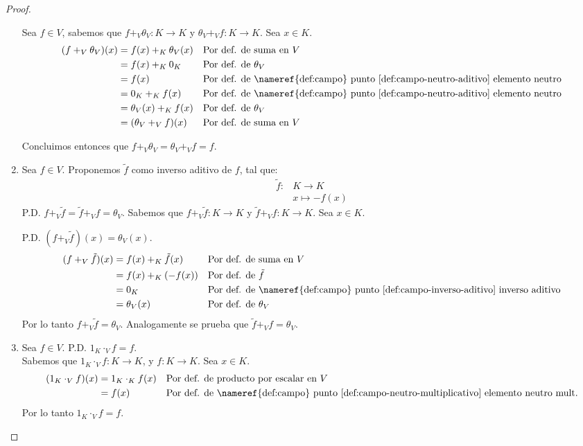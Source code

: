 \begin{proof}
\begin{enumerate}
        Sea $f \in V$, sabemos que $f +_V \theta_V: K \rightarrow K$ y $\theta_V +_V f: K \rightarrow K$. Sea $x \in K$.
        \begin{align*}
            (f +_V \theta_V)(x) &= f(x) +_K \theta_V(x) && \text{Por def. de suma en $V$} \\
            &= f(x) +_K 0_K && \text{Por def. de $\theta_V$} \\
            &= f(x) && \text{Por def. de \nameref{def:campo} punto \ref{def:campo-neutro-aditivo} elemento neutro} \\
            &= 0_K +_K f(x) && \text{Por def. de \nameref{def:campo} punto \ref{def:campo-neutro-aditivo} elemento neutro} \\
            &= \theta_V(x) +_K f(x) && \text{Por def. de $\theta_V$} \\
            &= (\theta_V +_V f)(x) && \text{Por def. de suma en $V$}
        \end{align*}
    
        Concluimos entonces que $f +_V \theta_V = \theta_V +_V f = f$.



        \item Sea $f \in V$. Proponemos $\tilde{f}$ como inverso aditivo de $f$, tal que:
        \begin{align*}
            \tilde{f}:& K \rightarrow K \\
            &x \mapsto -f(x)
        \end{align*}
        P.D. $f +_V \tilde{f} = \tilde{f} +_V f = \theta_V$.
        Sabemos que $f +_V \tilde{f}: K \rightarrow K$ y $\tilde{f} +_V f: K \rightarrow K$. Sea $x \in K$.
    
        P.D. $(f +_V \tilde{f})(x) = \theta_V(x)$.
        \begin{align*}
            (f +_V \tilde{f})(x) &= f(x) +_K \tilde{f}(x) && \text{Por def. de suma en $V$} \\
            &= f(x) +_K (-f(x)) && \text{Por def. de $\tilde{f}$} \\
            &= 0_K && \text{Por def. de \nameref{def:campo} punto \ref{def:campo-inverso-aditivo} inverso aditivo} \\
            &= \theta_V(x) && \text{Por def. de $\theta_V$}
        \end{align*}
        Por lo tanto $f +_V \tilde{f} = \theta_V$. Analogamente se prueba que $\tilde{f} +_V f = \theta_V$.


        \item Sea $f \in V$. P.D. $1_K \cdot_V f = f$.\\
        Sabemos que $1_K \cdot_V f: K \rightarrow K$, y $f: K \rightarrow K$. Sea $x \in K$.
        \begin{align*}
            (1_K \cdot_V f)(x) &= 1_K \cdot_K f(x) && \text{Por def. de producto por escalar en $V$} \\
            &= f(x) && \text{Por def. de \nameref{def:campo} punto \ref{def:campo-neutro-multiplicativo} elemento neutro mult.}
        \end{align*}
        Por lo tanto $1_K \cdot_V f = f$.



\end{enumerate}
\end{proof}
